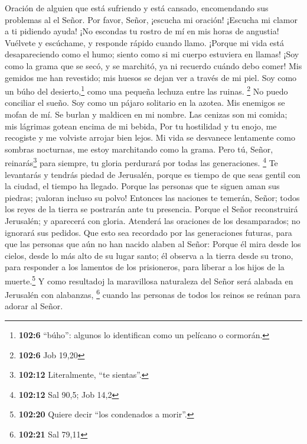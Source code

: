 Oración de alguien que está sufriendo y está cansado, encomendando sus
problemas al el Señor.  Por favor, Señor, ¡escucha mi
oración! ¡Escucha mi clamor a ti pidiendo ayuda!  ¡No
escondas tu rostro de mí en mis horas de angustia! Vuélvete y escúchame,
y responde rápido cuando llamo.  ¡Porque mi vida está
desapareciendo como el humo; siento como si mi cuerpo estuviera en
llamas!  ¡Soy como la grama que se secó, y se marchitó, ya
ni recuerdo cuándo debo comer!  Mis gemidos me han
revestido; mis huesos se dejan ver a través de mi piel. 
Soy como un búho del desierto,\footnote{\textbf{102:6} ``búho'': algunos
  lo identifican como un pelícano o cormorán.} como una pequeña lechuza
entre las ruinas. \footnote{\textbf{102:6} Job 19,20}  No
puedo conciliar el sueño. Soy como un pájaro solitario en la azotea.
 Mis enemigos se mofan de mí. Se burlan y maldicen en mi
nombre.  Las cenizas son mi comida; mis lágrimas gotean
encima de mi bebida,  Por tu hostilidad y tu enojo, me
recogiste y me volviste arrojar bien lejos.  Mi vida se
desvanece lentamente como sombras nocturnas, me estoy marchitando como
la grama.  Pero tú, Señor, reinarás\footnote{\textbf{102:12}
  Literalmente, ``te sientas''.} para siempre, tu gloria perdurará por
todas las generaciones. \footnote{\textbf{102:12} Sal 90,5; Job 14,2}
 Te levantarás y tendrás piedad de Jerusalén, porque es
tiempo de que seas gentil con la ciudad, el tiempo ha llegado.
 Porque las personas que te siguen aman sus piedras;
¡valoran incluso su polvo!  Entonces las naciones te
temerán, Señor; todos los reyes de la tierra se postrarán ante tu
presencia.  Porque el Señor reconstruirá Jerusalén; y
aparecerá con gloria.  Atenderá las oraciones de los
desamparados; no ignorará sus pedidos.  Que esto sea
recordado por las generaciones futuras, para que las personas que aún no
han nacido alaben al Señor:  Porque él mira desde los
cielos, desde lo más alto de su lugar santo; él observa a la tierra
desde su trono,  para responder a los lamentos de los
prisioneros, para liberar a los hijos de la muerte.\footnote{\textbf{102:20}
  Quiere decir ``los condenados a morir''.}  Y como
resultadoj la maravillosa naturaleza del Señor será alabada en Jerusalén
con alabanzas, \footnote{\textbf{102:21} Sal 79,11} 
cuando las personas de todos los reinos se reúnan para adorar al Señor.
